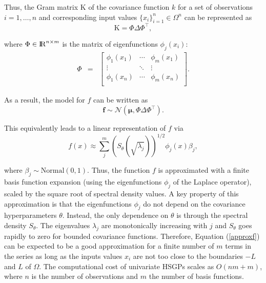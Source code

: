 \documentclass[]{interact}
\theoremstyle{plain}%
\theoremstyle{definition}
\theoremstyle{remark}
\begin{document}
Thus, the Gram matrix $\text{K}$ of the covariance function $k$ for a set of observations $i=1,\ldots,n$ and corresponding input values $\{x_i\}_{i=1}^{n} \in \Omega^{n}$ can be represented as
%
\begin{equation}
\text{K}= \Phi \Delta \Phi^\intercal, \nonumber
\end{equation}

\noindent where $\Phi \in {\rm I\!R}^{n\times m}$ is the matrix of eigenfunctions $\phi_j(x_i)$:
%
\begin{eqnarray}
\Phi &=&  \left[ {\begin{array}{ccc}
   \phi_1(x_1) & \cdots & \phi_m(x_1)  \\
    \vdots &\ddots & \vdots  \nonumber \\ 
    \phi_1(x_n) & \cdots & \phi_m(x_n) \\
  \end{array} } \right].
\end{eqnarray}
 
\noindent As a result, the model for $f$ can be written as
%
\begin{equation}
\bm{f} \sim \mathcal{N}(\bm{\mu},\Phi \Delta \Phi^\intercal). \nonumber
\end{equation}

\noindent This equivalently leads to a linear representation of $f$ via
%
\begin{equation}\label{approxf}
f(x) \approx \sum_{j}^m \left( S_{\theta}(\sqrt{\lambda_j})\right)^{1/2} \phi_j(x) \beta_j,
\end{equation}

\noindent where $\beta_j \sim \text{Normal}(0,1)$. Thus, the function $f$ is approximated with a finite basis function expansion (using the eigenfunctions $\phi_j$ of the Laplace operator), scaled by the square root of spectral density values. A key property of this approximation is that the eigenfunctions $\phi_j$ do not depend on the covariance hyperparameters $\theta$. Instead, the only dependence on $\theta$ is through the spectral density $S_{\theta}$. The eigenvalues $\lambda_j$ are monotonically increasing with $j$ and $S_{\theta}$ goes rapidly to zero for bounded covariance functions. Therefore, Equation (\ref{approxf}) can be expected to be a good approximation for a finite number of $m$ terms in the series as long as the inputs values $x_i$ are not too close to the boundaries $-L$ and $L$ of $\Omega$. The computational cost of univariate HSGPs scales as $O(nm + m)$, where $n$ is the number of observations and $m$ the number of basis functions.
\end{document}
